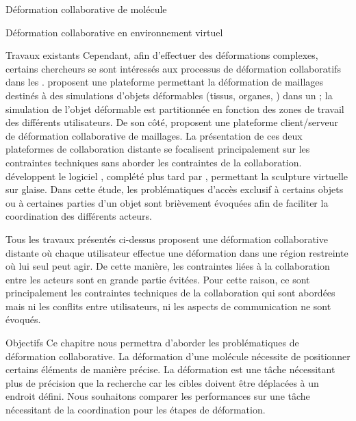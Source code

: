 \documentclass[myfrancais,ngerman,english,frenchb]{mythesis}
\begin{document}
\begin{mychapter}{Déformation collaborative de molécule}
\begin{mysection}{Déformation collaborative en environnement virtuel}
\begin{mysubsection}{Travaux existants}
				Cependant, afin d'effectuer des déformations complexes, certains chercheurs se sont intéressés aux processus de déformation collaboratifs dans les .
				 proposent une plateforme permettant la déformation de maillages destinés à des simulations d'objets déformables (tissus, organes, \myetc) dans un ; la simulation de l'objet déformable est partitionnée en fonction des zones de travail des différents utilisateurs.
				De son côté,  proposent une plateforme client/serveur de déformation collaborative de maillages.
				La présentation de ces deux plateformes de collaboration distante se focalisent principalement sur les contraintes techniques sans aborder les contraintes de la collaboration.
				 développent le logiciel \myClayWorks, complété plus tard par , permettant la sculpture virtuelle sur glaise.
				Dans cette étude, les problématiques d'accès exclusif à certains objets ou à certaines parties d'un objet sont brièvement évoquées afin de faciliter la coordination des différents acteurs.

				Tous les travaux présentés ci-dessus proposent une déformation collaborative distante où chaque utilisateur effectue une déformation dans une région restreinte où lui seul peut agir.
				De cette manière, les contraintes liées à la collaboration entre les acteurs sont en grande partie évitées.
				Pour cette raison, ce sont principalement les contraintes techniques de la collaboration qui sont abordées mais ni les conflits entre utilisateurs, ni les aspects de communication ne sont évoqués.
			\end{mysubsection}
			\begin{mysubsection}{Objectifs}
				Ce chapitre nous permettra d'aborder les problématiques de déformation collaborative.
				La déformation d'une molécule nécessite de positionner certains éléments de manière précise.
				La déformation est une tâche nécessitant plus de précision que la recherche car les cibles doivent être déplacées à un endroit défini.
				Nous souhaitons comparer les performances sur une tâche nécessitant de la coordination pour les étapes de déformation.


\end{mysubsection}
\end{mysection}
\end{mychapter}
\end{document}
